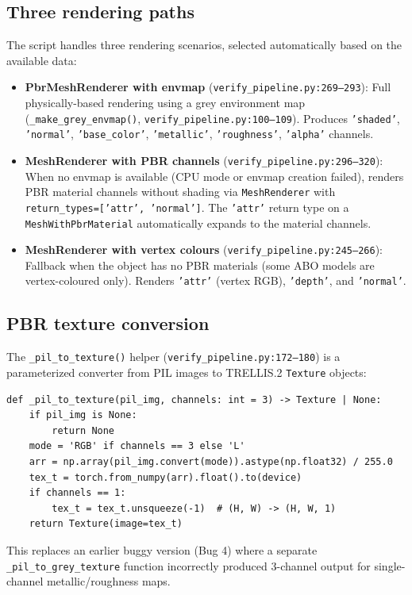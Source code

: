 \subsection{Three rendering paths}

The script handles three rendering scenarios, selected automatically based
on the available data:

\begin{itemize}
  \item \textbf{PbrMeshRenderer with envmap} (\texttt{verify\_pipeline.py:269--293}):
  Full physically-based rendering using a grey environment map
  (\texttt{\_make\_grey\_envmap()}, \texttt{verify\_pipeline.py:100--109}).
  Produces \texttt{'shaded'}, \texttt{'normal'}, \texttt{'base\_color'},
  \texttt{'metallic'}, \texttt{'roughness'}, \texttt{'alpha'} channels.

  \item \textbf{MeshRenderer with PBR channels} (\texttt{verify\_pipeline.py:296--320}):
  When no envmap is available (CPU mode or envmap creation failed), renders
  PBR material channels without shading via \texttt{MeshRenderer} with
  \texttt{return\_types=['attr', 'normal']}. The \texttt{'attr'} return type
  on a \texttt{MeshWithPbrMaterial} automatically expands to the material
  channels.

  \item \textbf{MeshRenderer with vertex colours} (\texttt{verify\_pipeline.py:245--266}):
  Fallback when the object has no PBR materials (some ABO models are
  vertex-coloured only). Renders \texttt{'attr'} (vertex RGB),
  \texttt{'depth'}, and \texttt{'normal'}.
\end{itemize}

\subsection{PBR texture conversion}

The \texttt{\_pil\_to\_texture()} helper (\texttt{verify\_pipeline.py:172--180})
is a parameterized converter from PIL images to TRELLIS.2 \texttt{Texture}
objects:
\begin{lstlisting}
def _pil_to_texture(pil_img, channels: int = 3) -> Texture | None:
    if pil_img is None:
        return None
    mode = 'RGB' if channels == 3 else 'L'
    arr = np.array(pil_img.convert(mode)).astype(np.float32) / 255.0
    tex_t = torch.from_numpy(arr).float().to(device)
    if channels == 1:
        tex_t = tex_t.unsqueeze(-1)  # (H, W) -> (H, W, 1)
    return Texture(image=tex_t)
\end{lstlisting}
This replaces an earlier buggy version (Bug 4) where a separate
\texttt{\_pil\_to\_grey\_texture} function incorrectly produced 3-channel
output for single-channel metallic/roughness maps.


